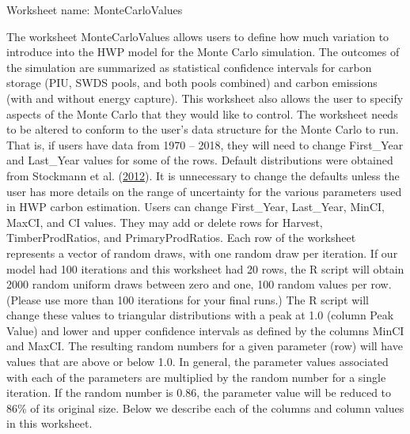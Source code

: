 \documentclass[
  openany]{book}
\begin{document}
Worksheet name: MonteCarloValues

The worksheet MonteCarloValues allows users to define how much variation
to introduce into the HWP model for the Monte Carlo simulation. The
outcomes of the simulation are summarized as statistical confidence
intervals for carbon storage (PIU, SWDS pools, and both pools combined)
and carbon emissions (with and without energy capture). This worksheet
also allows the user to specify aspects of the Monte Carlo that they
would like to control. The worksheet needs to be altered to conform to
the user's data structure for the Monte Carlo to run. That is, if users
have data from 1970 -- 2018, they will need to change First\_Year and
Last\_Year values for some of the rows. Default distributions were
obtained from Stockmann et al.
(\protect\hyperlink{ref-stockmann2012}{2012}). It is unnecessary to
change the defaults unless the user has more details on the range of
uncertainty for the various parameters used in HWP carbon estimation.
Users can change First\_Year, Last\_Year, MinCI, MaxCI, and CI values.
They may add or delete rows for Harvest, TimberProdRatios, and
PrimaryProdRatios. Each row of the worksheet represents a vector of
random draws, with one random draw per iteration. If our model had 100
iterations and this worksheet had 20 rows, the R script will obtain 2000
random uniform draws between zero and one, 100 random values per row.
(Please use more than 100 iterations for your final runs.) The R script
will change these values to triangular distributions with a peak at 1.0
(column Peak Value) and lower and upper confidence intervals as defined
by the columns MinCI and MaxCI. The resulting random numbers for a given
parameter (row) will have values that are above or below 1.0. In
general, the parameter values associated with each of the parameters are
multiplied by the random number for a single iteration. If the random
number is 0.86, the parameter value will be reduced to 86\% of its
original size. Below we describe each of the columns and column values
in this worksheet.
\end{document}
